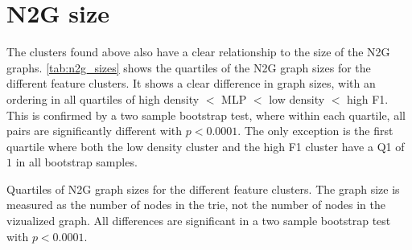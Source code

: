\section{N2G size}
The clusters found above also have a clear relationship to the size of the \ac{N2G} graphs.
\autoref{tab:n2g_sizes} shows the quartiles of the \ac{N2G} graph sizes for the different feature clusters.
It shows a clear difference in graph sizes, with an ordering in all quartiles of high density $<$ MLP $<$ low density $<$ high F1.
This is confirmed by a two sample bootstrap test, where within each quartile, all pairs are significantly different with $p<0.0001$.
The only exception is the first quartile where both the low density cluster and the high F1 cluster have a Q1 of $1$ in all bootstrap samples.

\begin{table}[ht]
    \centering
    
    \caption{Quartiles of \ac{N2G} graph sizes for the different feature clusters. The graph size is measured as the number of nodes in the trie, not the number of nodes in the vizualized graph.
    All differences are significant in a two sample bootstrap test with $p<0.0001$.
    }
    \label{tab:n2g_sizes}
\end{table}
